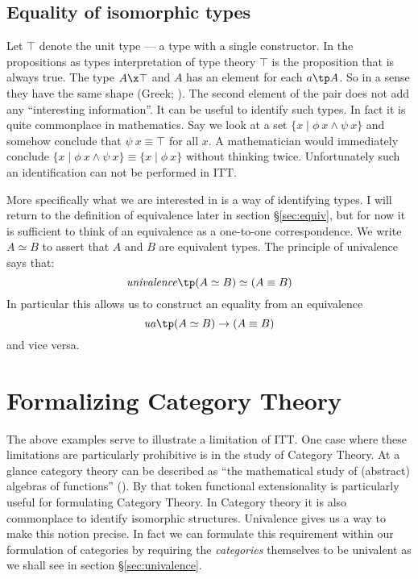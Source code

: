\subsection{Equality of isomorphic types}
%
Let $\top$ denote the unit type --- a type with a single constructor.
In the propositions as types interpretation of type theory $\top$ is
the proposition that is always true.  The type $A \x \top$ and $A$ has
an element for each $a \tp A$.  So in a sense they have the same shape
(Greek; ).  The second element of the pair does
not add any ``interesting information''.  It can be useful to identify
such types.  In fact it is quite commonplace in mathematics.  Say we
look at a set $\{x \mid \phi\ x \land \psi\ x\}$ and somehow conclude
that $\psi\ x \equiv \top$ for all $x$.  A mathematician would
immediately conclude $\{x \mid \phi\ x \land \psi\ x\} \equiv \{x \mid
\phi\ x\}$ without thinking twice.  Unfortunately such an
identification can not be performed in ITT.

More specifically what we are interested in is a way of identifying
 types.  I will return to the definition of
equivalence later in section \S\ref{sec:equiv}, but for now it is
sufficient to think of an equivalence as a one-to-one correspondence.
We write $A \simeq B$ to assert that $A$ and $B$ are equivalent types.
The principle of univalence says that:
%
$$\mathit{univalence} \tp (A \simeq B) \simeq (A \equiv B)$$
%
In particular this allows us to construct an equality from an equivalence
%
$$\mathit{ua} \tp (A \simeq B) \to (A \equiv B)$$
%
and vice versa.

\section{Formalizing Category Theory}
%
The above examples serve to illustrate a limitation of ITT.  One case
where these limitations are particularly prohibitive is in the study
of Category Theory.  At a glance category theory can be described as
``the mathematical study of (abstract) algebras of functions''
(\cite{awodey-2006}).  By that token functional extensionality is
particularly useful for formulating Category Theory.  In Category
theory it is also commonplace to identify isomorphic structures.
Univalence gives us a way to make this notion precise.  In fact we can
formulate this requirement within our formulation of categories by
requiring the \emph{categories} themselves to be univalent as we shall
see in section \S\ref{sec:univalence}.


